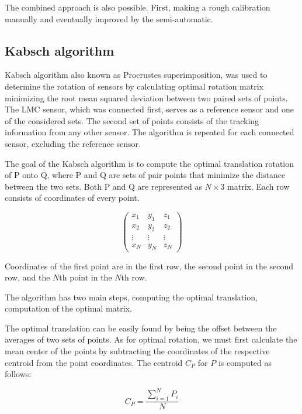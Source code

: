 The combined approach is also possible. First, making a rough calibration manually and eventually improved by the semi-automatic.

\subsection{Kabsch algorithm}

Kabsch algorithm \cite{kabsch} also known as Procrustes superimposition, was used to determine the rotation of sensors by calculating optimal rotation matrix minimizing the root mean squared deviation between two paired sets of points. The LMC sensor, which was connected first, serves as a reference sensor and one of the considered sets. The second set of points consists of the tracking information from any other sensor. The algorithm is repeated for each connected sensor, excluding the reference sensor.

The goal of the Kabsch algorithm is to compute the optimal translation rotation of P onto Q, where P and Q are sets of pair points that minimize the distance between the two sets. Both P and Q are represented as $N \times 3$ matrix. Each row consists of coordinates of every point.

\begin{equation}
    \begin{pmatrix}
        x_1 & y_1 & z_1\\
        x_2 & y_2 & z_2\\
        \vdots & \vdots & \vdots\\
        x_N & y_N & z_N
    \end{pmatrix}
\end{equation}

Coordinates of the first point are in the first row, the second point in the second row, and the $N$th point in the $N$th row.

The algorithm has two main steps, computing the optimal translation, computation of the optimal matrix.

The optimal translation can be easily found by being the offset between the averages of two sets of points. As for optimal rotation, we must first calculate the mean center of the points by subtracting the coordinates of the respective centroid from the point coordinates. The centroid $C_P$ for $P$ is computed as follows:

\begin{equation}
    {C_P = {\frac{\sum_{i=1}^{N}P_i}{N}}}
\end{equation}

